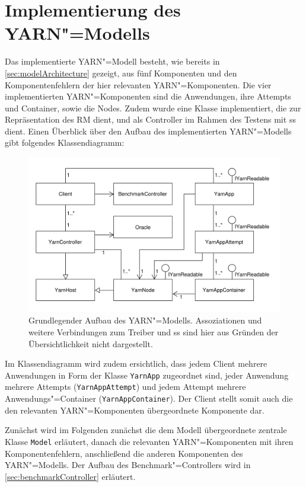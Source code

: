 \section{Implementierung des \acs{YARN}"=Modells}
\label{sec:yarnModel}

Das implementierte \ac{YARN}"=Modell besteht, wie bereits in \cref{sec:modelArchitecture} gezeigt, aus fünf Komponenten und den Komponentenfehlern der hier relevanten \ac{YARN}"=Komponenten.
Die vier implementierten \ac{YARN}"=Komponenten sind die Anwendungen, ihre Attempts und Container, sowie die Nodes.
Zudem wurde eine Klasse implementiert, die zur Repräsentation des \ac{RM} dient, und als Controller im Rahmen des Testens mit \ac{ss} dient.
Einen Überblick über den Aufbau des implementierten \ac{YARN}"=Modells gibt folgendes Klassendiagramm:

\begin{figure}[h]
    \includegraphics{./resources/yarnModel_ls_MA.pdf}
    \caption[Grundlegender Aufbau des \acs{YARN}"=Modells]
        {Grundlegender Aufbau des \acs{YARN}"=Modells.
        Assoziationen und weitere Verbindungen zum Treiber und \acs{ss} sind hier aus Gründen der Übersichtlichkeit nicht dargestellt.}
    \label{fig:yarnModelClassDiagram}
\end{figure}

Im Klassendiagramm wird zudem ersichtlich, dass jedem Client mehrere Anwendungen in Form der Klasse \texttt{YarnApp} zugeordnet sind, jeder Anwendung mehrere Attempts (\texttt{YarnAppAttempt}) und jedem Attempt mehrere Anwendungs"=Container (\texttt{YarnAppContainer}).
Der Client stellt somit auch die den relevanten \ac{YARN}"=Komponenten übergeordnete Komponente dar.

Zunächst wird im Folgenden zunächst die dem Modell übergeordnete zentrale Klasse \texttt{Model} erläutert, danach die relevanten \ac{YARN}"=Komponenten mit ihren Komponentenfehlern, anschließend die anderen Komponenten des \ac{YARN}"=Modells.
Der Aufbau des Benchmark"=Controllers wird in \cref{sec:benchmarkController} erläutert.


